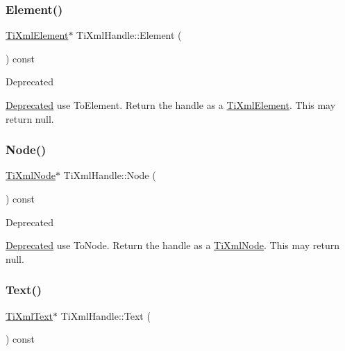 \subsubsection{\texorpdfstring{Element()}{Element()}}
{\footnotesize\ttfamily \hyperlink{class_ti_xml_element}{Ti\+Xml\+Element}$\ast$ Ti\+Xml\+Handle\+::\+Element (\begin{DoxyParamCaption}{ }\end{DoxyParamCaption}) const\hspace{0.3cm}{\ttfamily [inline]}}

\begin{DoxyRefDesc}{Deprecated}
\item[\hyperlink{deprecated__deprecated000002}{Deprecated}]use To\+Element. Return the handle as a \hyperlink{class_ti_xml_element}{Ti\+Xml\+Element}. This may return null. \end{DoxyRefDesc}
\hypertarget{class_ti_xml_handle_aec0e3ea58ff98a45cd13507a02e2ca1e}{}\label{class_ti_xml_handle_aec0e3ea58ff98a45cd13507a02e2ca1e} 
\subsubsection{\texorpdfstring{Node()}{Node()}}
{\footnotesize\ttfamily \hyperlink{class_ti_xml_node}{Ti\+Xml\+Node}$\ast$ Ti\+Xml\+Handle\+::\+Node (\begin{DoxyParamCaption}{ }\end{DoxyParamCaption}) const\hspace{0.3cm}{\ttfamily [inline]}}

\begin{DoxyRefDesc}{Deprecated}
\item[\hyperlink{deprecated__deprecated000001}{Deprecated}]use To\+Node. Return the handle as a \hyperlink{class_ti_xml_node}{Ti\+Xml\+Node}. This may return null. \end{DoxyRefDesc}
\hypertarget{class_ti_xml_handle_ad3b502c72059421e4dfcc7bda3c392fe}{}\label{class_ti_xml_handle_ad3b502c72059421e4dfcc7bda3c392fe} 
\subsubsection{\texorpdfstring{Text()}{Text()}}
{\footnotesize\ttfamily \hyperlink{class_ti_xml_text}{Ti\+Xml\+Text}$\ast$ Ti\+Xml\+Handle\+::\+Text (\begin{DoxyParamCaption}{ }\end{DoxyParamCaption}) const\hspace{0.3cm}{\ttfamily [inline]}}

